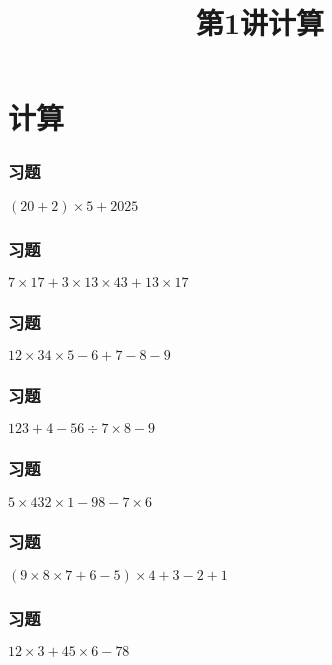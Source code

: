 \section{计算}

\title[第1讲\quad 计算]{第1讲\quad 计算} 
\author{}
\date{}
\begin{frame}
    \titlepage
\end{frame}

\begin{frame}
    \frametitle{习题\theframecounter}
    \vspace*{-3cm}
    \centering\textit{\Large $(20+2)\times 5 + 2025$}
\end{frame}

\begin{frame}
    \frametitle{习题\theframecounter}
    \vspace*{-3cm}
    \centering\textit{\Large $7\times 17 + 3\times 13\times 43 + 13\times 17$}
\end{frame}

\begin{frame}
    \frametitle{习题\theframecounter}
    \vspace*{-3cm}
    \centering\textit{\Large $12\times 34\times 5 - 6 + 7 - 8 - 9$}
\end{frame}

\begin{frame}
    \frametitle{习题\theframecounter}
    \vspace*{-3cm}
    \centering\textit{\Large $123 + 4 - 56\div 7\times 8 - 9$}
\end{frame}

\begin{frame}
    \frametitle{习题\theframecounter}
    \vspace*{-3cm}
    \centering\textit{\Large $5\times 432\times 1 - 98 - 7\times 6$}
\end{frame}

\begin{frame}
    \frametitle{习题\theframecounter}
    \vspace*{-3cm}
    \centering\textit{\Large $(9\times 8\times 7 + 6 - 5)\times 4 + 3 -2 +1$ }
\end{frame}

\begin{frame}
    \frametitle{习题\theframecounter} 
    \vspace*{-3cm}   
    \centering\textit{\Large $12\times 3 + 45\times 6 - 78$}
\end{frame}

